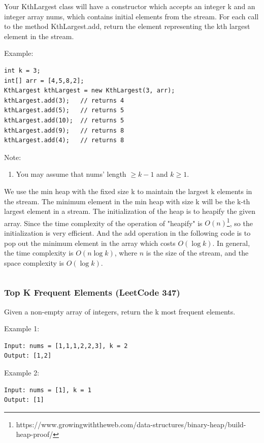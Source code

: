\documentclass[11pt]{article}
\begin{document}
Your KthLargest class will have a constructor which accepts an integer k and an integer array nums, which contains initial elements from the stream. For each call to the method KthLargest.add, return the element representing the kth largest element in the stream.

Example:
\begin{verbatim}
int k = 3;
int[] arr = [4,5,8,2];
KthLargest kthLargest = new KthLargest(3, arr);
kthLargest.add(3);   // returns 4
kthLargest.add(5);   // returns 5
kthLargest.add(10);  // returns 5
kthLargest.add(9);   // returns 8
kthLargest.add(4);   // returns 8
\end{verbatim}

Note: 
\begin{enumerate}
	\item You may assume that nums' length $\geq k-1$  and $k \geq 1$.
\end{enumerate}

We use the min heap with the fixed size k to maintain the largest k elements in the stream. 
The minimum element in the min heap with size k will be the k-th largest element in a stream. 
The initialization of the heap is to heapify the given array.
Since the time complexity of the operation of "heapify" is $O(n)$\footnote{https://www.growingwiththeweb.com/data-structures/binary-heap/build-heap-proof/}, so the initialization is very efficient. 
And the add operation in the following code is to pop out the minimum element in the array which costs $O(\log k)$. 
In general, the time complexity is $O(n\log k)$, where $n$ is the size of the stream, and the space complexity is $O(\log k)$. 

\inputminted[breaklines=true,frame=leftline, linenos=true]{python}{src/kthLargestInStream.py}


\subsubsection{Top K Frequent Elements (LeetCode 347)}

Given a non-empty array of integers, return the k most frequent elements.

Example 1:
\begin{verbatim}
Input: nums = [1,1,1,2,2,3], k = 2
Output: [1,2]
\end{verbatim}

Example 2:
\begin{verbatim}
Input: nums = [1], k = 1
Output: [1]
\end{verbatim}
\end{document}
